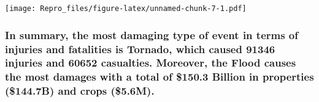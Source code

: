 \documentclass[]{article}
\begin{document}
\texttt{[image: Repro\_files/figure-latex/unnamed-chunk-7-1.pdf]}

\subsubsection{In summary, the most damaging type of event in terms of
injuries and fatalities is Tornado, which caused 91346 injuries and
60652 casualties. Moreover, the Flood causes the most damages with a
total of \$150.3 Billion in properties (\$144.7B) and crops
(\$5.6M).}\label{in-summary-the-most-damaging-type-of-event-in-terms-of-injuries-and-fatalities-is-tornado-which-caused-91346-injuries-and-60652-casualties.-moreover-the-flood-causes-the-most-damages-with-a-total-of-150.3-billion-in-properties-144.7b-and-crops-5.6m.}
\end{document}
